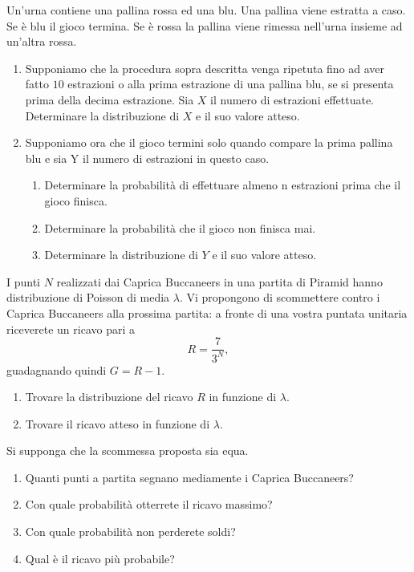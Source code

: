 
Un'urna contiene una pallina rossa ed una blu. Una pallina viene estratta a caso. Se è blu il gioco termina. Se è rossa la pallina viene rimessa nell'urna insieme ad un'altra rossa.
\begin{enumerate}
\item Supponiamo che la procedura sopra descritta venga ripetuta fino ad aver fatto $10$ estrazioni o alla prima estrazione di una pallina blu, se si presenta prima della decima estrazione. Sia $X$ il numero di estrazioni effettuate. Determinare la distribuzione di $X$ e il suo valore atteso.
\item Supponiamo ora che il gioco termini solo quando compare la prima pallina blu e sia Y il numero di estrazioni in questo caso.
\begin{enumerate}
\item Determinare la probabilità di effettuare almeno n estrazioni prima che il gioco finisca.
\item Determinare la probabilità che il gioco non finisca mai.
\item Determinare la distribuzione di $Y$ e il suo valore atteso.
\end{enumerate}
\end{enumerate}


I punti $N$ realizzati dai Caprica Buccaneers in una partita di Piramid hanno distribuzione di Poisson di media $\lambda $. Vi propongono di scommettere contro i Caprica Buccaneers alla prossima partita: a fronte di una vostra puntata unitaria riceverete un ricavo pari a
\begin{equation*}
R=\frac{7}{3^{N}} ,
\end{equation*}
guadagnando quindi $G=R-1$.
\begin{enumerate}
\item Trovare la distribuzione del ricavo $R$ in funzione di $\lambda $.
\item Trovare il ricavo atteso in funzione di $\lambda $.
\end{enumerate}

Si supponga che la scommessa proposta sia equa.
\begin{enumerate}
\item Quanti punti a partita segnano mediamente i Caprica Buccaneers?
\item Con quale probabilità otterrete il ricavo massimo?
\item Con quale probabilità non perderete soldi?
\item Qual è il ricavo più probabile?
\end{enumerate}


